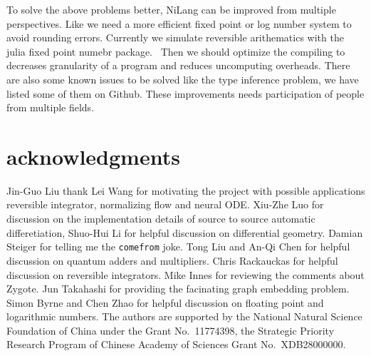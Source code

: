 \documentclass[aps,twocolumn,longbibliography,english,superscriptaddress]{revtex4-1}
\newcommand{\<}{\langle}
\renewcommand{\>}{\rangle}
\newcommand{\blue}[1]{[{\bf  \color{blue}{JG: #1}}]}
\theoremstyle{definition}\newtheorem{definition}{\textit{Definition}}
\begin{document}
To solve the above problems better, NiLang can be improved from multiple perspectives.
Like we need a more efficient fixed point or log number system to avoid rounding errors. Currently we simulate reversible arithematics with the julia fixed point numebr package.~\cite{FixedPointNumbers}
Then we should optimize the compiling to decreases granularity of a program and reduces uncomputing overheads.
There are also some known issues to be solved like the type inference problem, we have listed some of them on Github.
These improvements needs participation of people from multiple fields.


\section{acknowledgments}
Jin-Guo Liu thank Lei Wang for motivating the project with possible applications reversible integrator, normalizing flow and neural ODE.
Xiu-Zhe Luo for discussion on the implementation details of source to source automatic differetiation,
Shuo-Hui Li for helpful discussion on differential geometry.
Damian Steiger for telling me the \texttt{comefrom} joke.
Tong Liu and An-Qi Chen for helpful discussion on quantum adders and multipliers.
Chris Rackauckas for helpful discussion on reversible integrators.
Mike Innes for reviewing the comments about Zygote.
Jun Takahashi for providing the facinating graph embedding problem.
Simon Byrne and Chen Zhao for helpful discussion on floating point and logarithmic numbers.
The authors are supported by the National Natural Science Foundation of China under the Grant No.~11774398, the Strategic Priority Research Program of Chinese Academy of Sciences Grant No.~XDB28000000.




\pagebreak
\appendix
\end{document}
